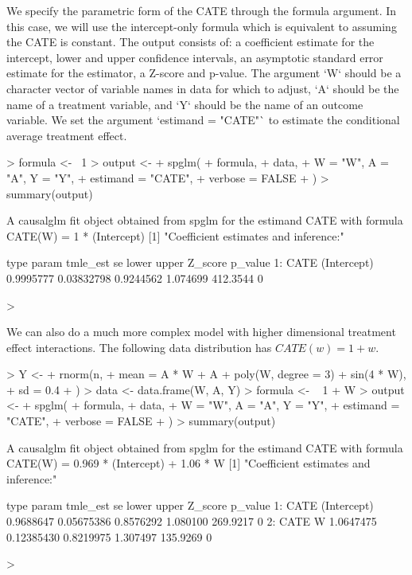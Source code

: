\documentclass{article}
\begin{document}
We specify the parametric form of the CATE through the formula argument. In this case, we will use the intercept-only formula which is equivalent to assuming the CATE is constant.  The output consists of:
a coefficient estimate for the intercept, lower and upper confidence intervals, an asymptotic standard error estimate for the estimator, a Z-score and p-value. The argument `W` should be a character vector of variable names in data for which to adjust, `A` should be the name of a treatment variable, and `Y` should be the name of an outcome variable. We set the argument `estimand = "CATE"` to estimate the conditional average treatment effect.
\begin{Schunk}
\begin{Sinput}
> formula <- ~1
> output <-
+   spglm(
+     formula,
+     data,
+     W = "W", A = "A", Y = "Y",
+     estimand = "CATE",
+     verbose = FALSE
+   )
> summary(output)
\end{Sinput}
\begin{Soutput}
A causalglm fit object obtained from spglm for the estimand CATE with formula 
CATE(W) = 1 * (Intercept)
[1] "Coefficient estimates and inference:"

   type       param  tmle_est         se     lower    upper  Z_score p_value
1: CATE (Intercept) 0.9995777 0.03832798 0.9244562 1.074699 412.3544       0
\end{Soutput}
\begin{Sinput}
> 
\end{Sinput}
\end{Schunk}
We can also do a much more complex model with higher dimensional treatment effect interactions. The following data distribution has $CATE(w) = 1 + w$.  
\begin{Schunk}
\begin{Sinput}
> Y <-
+   rnorm(n,
+     mean = A * W + A + poly(W, degree = 3) + sin(4 * W),
+     sd = 0.4
+   )
> data <- data.frame(W, A, Y)
> formula <- ~ 1 + W
> output <-
+   spglm(
+     formula,
+     data,
+     W = "W", A = "A", Y = "Y",
+     estimand = "CATE",
+     verbose = FALSE
+   )
> summary(output)
\end{Sinput}
\begin{Soutput}
A causalglm fit object obtained from spglm for the estimand CATE with formula 
CATE(W) = 0.969 * (Intercept) + 1.06 * W
[1] "Coefficient estimates and inference:"

   type       param  tmle_est         se     lower    upper  Z_score p_value
1: CATE (Intercept) 0.9688647 0.05675386 0.8576292 1.080100 269.9217       0
2: CATE           W 1.0647475 0.12385430 0.8219975 1.307497 135.9269       0
\end{Soutput}
\begin{Sinput}
> 
\end{Sinput}
\end{Schunk}
\end{document}
